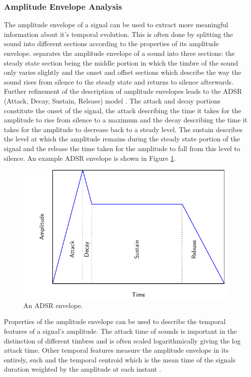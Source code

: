 		\subsubsection*{Amplitude Envelope Analysis}
			The amplitude envelope of a signal can be used to extract more meaningful information about it's
			temporal evolution. This is often done by splitting the sound into different sections according to
			the properties of its amplitude envelope. \citet{howard2009acoustics} separates the amplitude
			envelope of a sound into three sections: the steady state section being the middle portion in which
			the timbre of the sound only varies slightly and the onset and offset sections which describe the
			way the sound rises from silence to the steady state and returns to silence afterwards. Further
			refinement of the description of amplitude envelopes leads to the ADSR (Attack, Decay, Sustain,
			Release) model \citep{descrivan2012music}. The attack and decay portions constitute the onset of
			the signal, the attack describing the time it takes for the amplitude to rise from silence to a
			maximum and the decay describing the time it takes for the amplitude to decrease back to a steady
			level. The sustain describes the level at which the amplitude remains during the steady state
			portion of the signal and the release the time taken for the amplitude to fall from this level to
			silence. An example ADSR envelope is shown in Figure \ref{fig:ADSR}.

			\begin{figure}[h!]
				\centering
				\includegraphics{chapter2/Images/ADSR.pdf}
				\caption{An ADSR envelope.}
				\label{fig:ADSR}
			\end{figure}

			Properties of the amplitude envelope can be used to describe the temporal features of a signal's
			amplitude. The attack time of sounds is important in the distinction of different timbres
			\citep{ilmoniemi2004subjective} and is often scaled logarithmically giving the log attack time.
			Other temporal features measure the amplitude envelope in its entirely, such and the temporal
			centroid which is the mean time of the signals duration weighted by the amplitude at each instant
			\citep{peeters2000instrument}.

